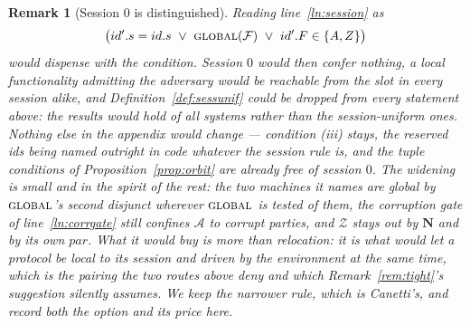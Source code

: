 \documentclass[11pt,a4paper]{article}
\newcommand{\admits}{\mathbf{N}}
\newcommand{\pars}{\mathit{par}}
\newcommand{\F}{\mathcal{F}}
\newcommand{\Zenv}{\mathcal{Z}}
\newcommand{\Adv}{\mathcal{A}}
\newcommand{\op}[1]{\textsc{#1}}
\newcommand{\id}{id}
\theoremstyle{accentdef}
\newtheorem{remark}[definition]{Remark}
\theoremstyle{accentplain}
\begin{document}
\begin{remark}[Session $0$ is distinguished]
Reading line~\ref{ln:session} as
\[
  \bigl(\id'.s = \id.s \ \vee\ \op{global}(\F) \ \vee\ \id'.F \in \{A,Z\}\bigr)
\]
would dispense with the condition. Session $0$ would then confer nothing, a local functionality
admitting the adversary would be reachable from the slot in every session alike, and
Definition~\ref{def:sessunif} could be dropped from every statement above: the results would hold of
all systems rather than the session-uniform ones. Nothing else in the appendix would change ---
condition (iii) stays, the reserved ids being named outright in code whatever the session rule is,
and the tuple conditions of Proposition~\ref{prop:orbit} are already free of session $0$. The
widening is
small and in the spirit of the rest: the two machines it names are global by $\op{global}$'s second
disjunct wherever $\op{global}$ is tested of them, the corruption gate of line~\ref{ln:corrgate}
still confines $\Adv$ to corrupt parties, and $\Zenv$ stays out by $\admits$ and by its own $\pars$.
What it would buy is more than relocation: it is what would let a protocol be local to its session and
driven by the environment at the same time, which is the pairing the two routes above deny and which
Remark~\ref{rem:tight}'s suggestion silently assumes. We keep the narrower rule, which is Canetti's,
and record both the option and its price here.
\end{remark}
\end{document}
